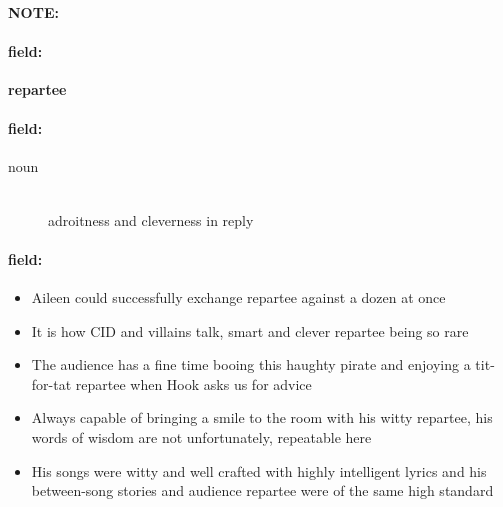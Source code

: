 \documentclass[12pt]{article}
\newenvironment{note}{\paragraph{NOTE:}}{}
\newenvironment{field}{\paragraph{field:}}{}
\begin{document}
\begin{note}
\begin{field}
\textbf{\large repartee}
\end{field}


\begin{field}
\begin{description}
\item[noun] \hfill \\ 
adroitness and cleverness in reply

\end{description}
\end{field}

\begin{field}
\begin{itemize}
\item Aileen could successfully exchange repartee against a dozen at once
\item It is how CID and villains talk, smart and clever repartee being so rare
\item The audience has a fine time booing this haughty pirate and enjoying a tit-for-tat repartee when Hook asks us for advice
\item Always capable of bringing a smile to the room with his witty repartee, his words of wisdom are not unfortunately, repeatable here
\item His songs were witty and well crafted with highly intelligent lyrics and his between-song stories and audience repartee were of the same high standard
\end{itemize}
\end{field}
\end{note}
\end{document}
